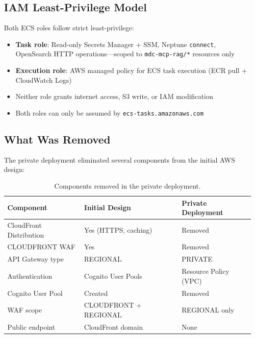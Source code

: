 \documentclass[11pt,letterpaper]{article}
\begin{document}
\subsection{IAM Least-Privilege Model}

Both ECS roles follow strict least-privilege:

\begin{itemize}[noitemsep]
    \item \textbf{Task role}: Read-only Secrets Manager + SSM, Neptune
          \texttt{connect}, OpenSearch HTTP operations---scoped to
          \texttt{mdc-mcp-rag/*} resources only
    \item \textbf{Execution role}: AWS managed policy for ECS task execution
          (ECR pull + CloudWatch Logs)
    \item Neither role grants internet access, S3 write, or IAM modification
    \item Both roles can only be assumed by \texttt{ecs-tasks.amazonaws.com}
\end{itemize}

\subsection{What Was Removed}

The private deployment eliminated several components from the initial
AWS design:

\begin{table}[H]
\centering
\footnotesize
\begin{tabular}{@{}lll@{}}
\toprule
\textbf{Component} & \textbf{Initial Design} & \textbf{Private Deployment} \\
\midrule
CloudFront Distribution & Yes (HTTPS, caching) & Removed \\
CLOUDFRONT WAF & Yes & Removed \\
API Gateway type & REGIONAL & PRIVATE \\
Authentication & Cognito User Pools & Resource Policy (VPC) \\
Cognito User Pool & Created & Removed \\
WAF scope & CLOUDFRONT + REGIONAL & REGIONAL only \\
Public endpoint & CloudFront domain & None \\
\bottomrule
\end{tabular}
\caption{Components removed in the private deployment.}
\label{tab:removed-components}
\end{table}
\end{document}
